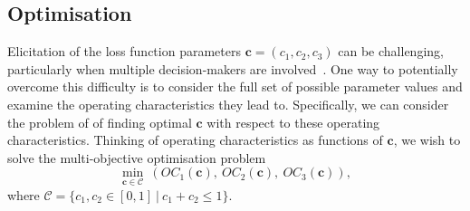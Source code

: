\documentclass[AMA,STIX1COL]{WileyNJD-v2}
\begin{document}
%

\subsection{Optimisation}\label{sec:optimisation}

Elicitation of the loss function parameters $\mathbf{c} = (c_1, c_2, c_3)$ can be challenging, particularly when multiple decision-makers are involved~\cite{Keeney1976}. One way to potentially overcome this difficulty is to consider the full set of possible parameter values and examine the operating characteristics they lead to. Specifically, we can consider the problem of of finding optimal $\mathbf{c}$ with respect to these operating characteristics. Thinking of operating characteristics as functions of $\mathbf{c}$, we wish to solve the multi-objective optimisation problem
\begin{equation}\label{eqn:opt}
\min_{\mathbf{c} \in \mathcal{C}} ~ \left( OC_{1}(\mathbf{c}),~ OC_{2}(\mathbf{c}),~ OC_{3}(\mathbf{c}) \right),
\end{equation}
where $\mathcal{C} = \{c_{1}, c_{2} \in [0,1] ~|~ c_{1} + c_{2} \leq 1\}$. 
\end{document}
